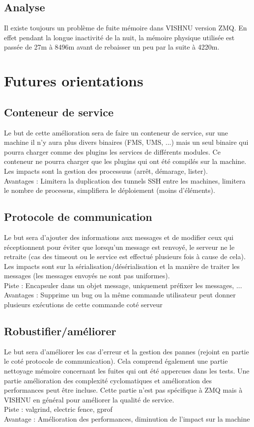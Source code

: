 \documentclass{article}
\begin{document}
\subsection{Analyse}
Il existe toujours un problème de fuite mémoire dans VISHNU version ZMQ.
En effet pendant la longue inactivité de la nuit, la mémoire physique
utilisée est passée de 27m à 8496m avant de rebaisser un peu par la suite
à 4220m.


\section{Futures orientations}

\subsection{Conteneur de service}
Le but de cette amélioration sera de faire un conteneur
de service, sur une machine il n'y aura plus divers binaires (FMS, UMS, ...) mais un
seul binaire qui pourra charger comme des plugins les services de différents modules.
Ce conteneur ne pourra charger que les plugins qui ont été compilés sur la machine. \\
Les impacts sont la gestion des processuus (arrêt, démarage, lister).\\
Avantages : Limitera la duplication des tunnels SSH entre les machines, limitera le
nombre de processus, simplifiera le déploiement (moins d'éléments).

\subsection{Protocole de communication}
Le but sera d'ajouter des informations aux messages et de modifier ceux qui réceptionnent
pour éviter que lorsqu'un message est renvoyé, le serveur ne le retraite (cas des timeout
ou le service est effectué plusieurs fois à cause de cela). \\
Les impacts sont sur la sérialisation/désérialisation et la manière de traiter les messages
(les messages envoyés ne sont pas uniformes). \\
Piste : Encapsuler dans un objet message, uniquement préfixer les messages, ... \\
Avantages : Supprime un bug ou la même commande utilisateur peut donner plusieurs 
exécutions de cette commande coté serveur

\subsection{Robustifier/améliorer}
Le but sera d'améliorer les cas d'erreur et la gestion des pannes (rejoint en partie
le coté protocole de communication). Cela comprend également une partie nettoyage mémoire
concernant les fuites qui ont été appercues dans les tests. Une partie amélioration des
complexité cyclomatiques et amélioration des performances peut être incluse.
Cette partie n'est pas spécifique à ZMQ mais à VISHNU en général pour améliorer la qualité de service. \\
Piste : valgrind, electric fence, gprof \\
Avantage : Amélioration des performances, diminution de l'impact sur la machine
\end{document}
